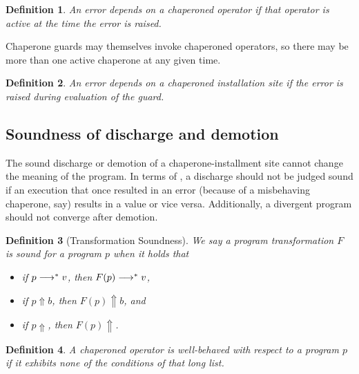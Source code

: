 \documentclass{sigplanconf}
\newtheorem{definition}{Definition}
\begin{document}
\begin{definition}
An error \emph{depends} on a chaperoned operator if that operator is active at the time the error is raised.
\end{definition}

Chaperone guards may themselves invoke chaperoned operators, so there may be more than one active chaperone at any given time.

\begin{definition}
An error \emph{depends} on a chaperoned installation site if the error is raised during evaluation of the guard.
\end{definition}


\subsection{Soundness of discharge and demotion}

The sound discharge or demotion of a chaperone-installment site cannot change the meaning of the program.
In terms of \chapcalc, a discharge should not be judged sound if an execution that once resulted in an error (because of a misbehaving chaperone, say) results in a value or vice versa.
Additionally, a divergent program should not converge after demotion.


\begin{definition}[Transformation Soundness]
We say a program transformation $F$ is \emph{sound} for a program $p$ when it holds that
\begin{itemize}
\item if $p\longrightarrow^{*} v$, then $F(p)\longrightarrow^{*} v$,
\item if $p\Uparrow b$, then $F(p)\Uparrow b$, and
\item if $p\Uparrow$, then $F(p)\Uparrow$.
\end{itemize}
\end{definition}

\begin{definition}
A chaperoned operator is \emph{well-behaved} with respect to a program $p$ if it exhibits none of the conditions of that long list.
\end{definition}
\end{document}
